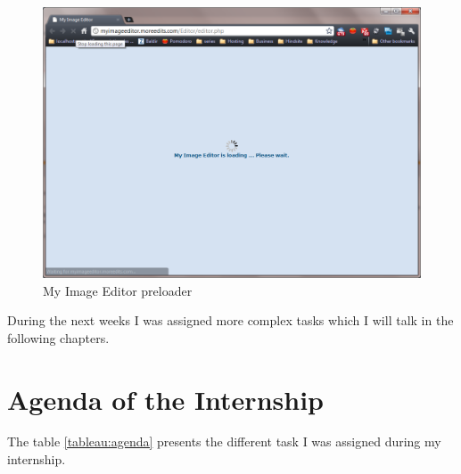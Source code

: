 \begin{figure}[!h]
\centering
\includegraphics[width=.80\textwidth]{img/myimage_preloader.png}
\caption{My Image Editor preloader}
\label{figure:ewc-image_preloader}
\end{figure}

During the next weeks I was assigned more complex tasks which I will talk in the following chapters.

\section{Agenda of the Internship}

The table \ref{tableau:agenda} presents the different task I was assigned during my internship.

